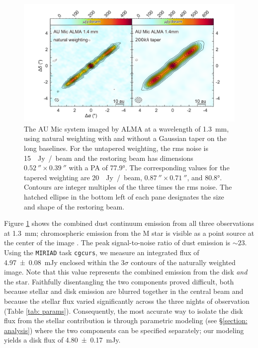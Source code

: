 \documentclass[modern]{aastex62}
\begin{document}
\begin{figure}
  \includegraphics[width=\linewidth]{../figures/aumic_imaged}
  \caption{The AU Mic system imaged by ALMA at a wavelength of \SI{1.3}{mm}, using natural weighting with and without a Gaussian taper on the long baselines. 
  For the untapered weighting, the rms noise is \SI{15}{\mu Jy / beam} and the restoring beam has dimensions $\SI{0.52}{\arcsecond} \times \SI{0.39}{\arcsecond}$ with a PA of \ang[angle-symbol-over-decimal]{77.9}.
  The corresponding values for the tapered weighting are \SI{20}{\mu Jy / beam}, $\SI{0.87}{\arcsecond} \times \SI{0.71}{\arcsecond}$, and \ang[angle-symbol-over-decimal]{80.8}. 
  Contours are integer multiples of the three times the rms noise.
  The hatched ellipse in the bottom left of each pane designates the size and shape of the restoring beam.
  }
  \label{fig: aumic_imaged}
\end{figure}

Figure \ref{fig: aumic_imaged} shows the combined dust continuum emission from all three observations at \SI{1.3}{mm}; chromospheric emission from the M star is visible as a point source at the center of the image \citep{cranmer13}. 
The peak signal-to-noise ratio of dust emission is $\sim 23$.
Using the \texttt{MIRIAD} task \texttt{cgcurs}, we measure an integrated flux of \SI{4.97 \pm 0.08}{\milli Jy} enclosed within the $3\sigma$ contours of the naturally weighted image.  
Note that this value represents the combined emission from the disk \textit{and} the star. 
Faithfully disentangling the two components proved difficult, both because stellar and disk emission are blurred together in the central beam and because the stellar flux varied significantly across the three nights of observation (Table \ref{tab: params}).
Consequently, the most accurate way to isolate the disk flux from the stellar contribution is through parametric modeling (see \S \ref{section: analysis}) where the two components can be specified separately; our modeling yields a disk flux of \SI{4.80 \pm 0.17}{mJy}.
\end{document}
